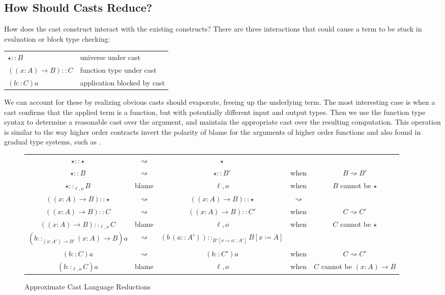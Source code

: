 \subsection{How Should Casts Reduce?}
 
How does the cast construct interact with the existing constructs?
There are three interactions that could cause a term to be stuck in evaluation or block type checking:
 
\begin{tabular}{ll}
$\star::B$ & universe under cast\tabularnewline
$\left(\left(x:A\right)\rightarrow B\right)::C$ & function type under cast\tabularnewline
$\left(b::C\right)a$ & application blocked by cast\tabularnewline
\end{tabular}
 
We can account for these by realizing obvious casts should evaporate, freeing up the underlying term.
The most interesting case is when a cast confirms that the applied term is a function, but with potentially different input and output types.
Then we use the function type syntax to determine a reasonable cast over the argument, and maintain the appropriate cast over the resulting computation.
This operation is similar to the way higher order contracts invert the polarity of blame for the arguments of higher order functions \cite{10.1145/581478.581484} and also found in gradual type systems, such as \cite{10.1007/978-3-642-00590-9_1}.
 
\begin{sidewaysfigure}
\begin{tabular}{ccccc}
$\star::\star$ & $\rightsquigarrow$ & $\star$ &  & \tabularnewline
$\star::B$ & $\rightsquigarrow$ & $\star::B'$ & when  & $B\rightsquigarrow B'$\tabularnewline
$\star::_{\ell,o}B$ & blame & $\ell,o$ & when  & $B$ cannot be $\star$ \tabularnewline
$\left(\left(x:A\right)\rightarrow B\right)::\star$ & $\rightsquigarrow$ & $\left(\left(x:A\right)\rightarrow B\right)::\star$ & $\rightsquigarrow$ & \tabularnewline
$\left(\left(x:A\right)\rightarrow B\right)::C$ & $\rightsquigarrow$ & $\left(\left(x:A\right)\rightarrow B\right)::C'$ & when  & $C\rightsquigarrow C'$\tabularnewline
$\left(\left(x:A\right)\rightarrow B\right)::_{\ell,o}C$ & blame & $\ell,o$ & when  & $C$ cannot be $\star$ \tabularnewline
$\left(b::_{\left(x:A'\right)\rightarrow B'}\left(x:A\right)\rightarrow B\right)a$ & $\rightsquigarrow$ & $\left(b\,\left(a::A'\right)\right)::_{B'\left[x\coloneqq a::A'\right]}B\left[x\coloneqq A\right]$ &  & \tabularnewline
$\left(b::C\right)a$ & $\rightsquigarrow$ & $\left(b::C'\right)a$ & when  & $C\rightsquigarrow C'$\tabularnewline
$\left(b::_{\ell,o}C\right)a$ & blame & $\ell,o$ & when  & $C$ cannot be $\left(x:A\right)\rightarrow B$ \tabularnewline
\end{tabular}
 
\caption{Approximate Cast Language Reductions}
\label{fig:cast-aprox-red}
\end{sidewaysfigure}
 
